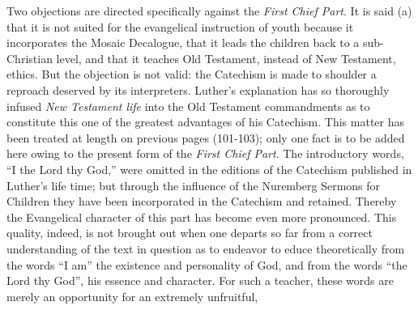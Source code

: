 Two objections are directed specifically against the \emph{First Chief Part}. It is said (a) that it is not suited for the evangelical instruction of youth because it incorporates the Mosaic Decalogue, that it leads the children back to a sub-Christian level, and that it teaches Old Testament, instead of New Testament, ethics. But the objection is not valid: the Catechism is made to shoulder a reproach deserved by its interpreters. Luther’s explanation has so thoroughly infused \emph{New Testament life} into the Old Testament commandments as to constitute this one of the greatest advantages of his Catechism. This matter has been treated at length on previous pages (101-103); only one fact is to be added here owing to the present form of the \emph{First Chief Part}. The introductory words, “I the Lord thy God,” were omitted in the editions of the Catechism published in Luther’s life time; but through the influence of the Nuremberg Sermons for Children they have been incorporated in the Catechism and retained. Thereby the Evangelical character of this part has become even more pronounced. This quality, indeed, is not brought out when one departs so far from a correct understanding of the text in question as to endeavor to educe theoretically from the words “I am” the existence and personality of God, and from the words “the Lord thy God”, his essence and character. For such a teacher, these words are merely an opportunity for an extremely unfruitful,
